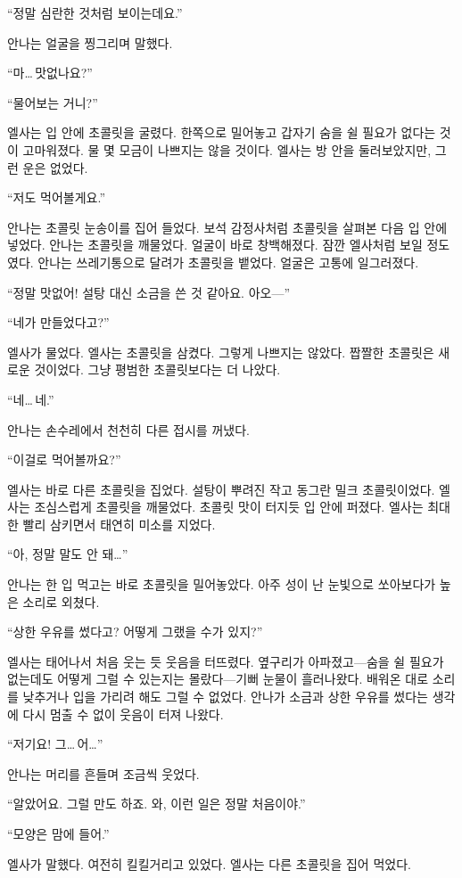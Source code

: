 ``정말 심란한 것처럼 보이는데요.''

안나는 얼굴을 찡그리며 말했다.

``마\ldots\,맛없나요?''

`` 물어보는 거니?''

엘사는 입 안에 초콜릿을 굴렸다. 한쪽으로 밀어놓고 갑자기 숨을 쉴 필요가 없다는 것이 고마워졌다. 물 몇 모금이 나쁘지는 않을 것이다. 엘사는 방 안을 둘러보았지만, 그런 운은 없었다.

``저도 먹어볼게요.''

안나는 초콜릿 눈송이를 집어 들었다. 보석 감정사처럼 초콜릿을 살펴본 다음 입 안에 넣었다. 안나는 초콜릿을 깨물었다. 얼굴이 바로 창백해졌다. 잠깐 엘사처럼 보일 정도였다. 안나는 쓰레기통으로 달려가 초콜릿을 뱉었다. 얼굴은 고통에 일그러졌다.

``정말 맛없어! 설탕 대신 소금을 쓴 것 같아요. 아오—''

``네가 만들었다고?''

엘사가 물었다. 엘사는 초콜릿을 삼켰다. 그렇게 나쁘지는 않았다. 짭짤한 초콜릿은 새로운 것이었다. 그냥 평범한 초콜릿보다는 더 나았다.

``네\ldots\,네.''

안나는 손수레에서 천천히 다른 접시를 꺼냈다.

``이걸로 먹어볼까요?''

엘사는 바로 다른 초콜릿을 집었다. 설탕이 뿌려진 작고 동그란 밀크 초콜릿이었다. 엘사는 조심스럽게 초콜릿을 깨물었다. 초콜릿 맛이 터지듯 입 안에 퍼졌다. 엘사는 최대한 빨리 삼키면서 태연히 미소를 지었다.

``아, 정말 말도 안 돼\ldots''

안나는 한 입 먹고는 바로 초콜릿을 밀어놓았다. 아주 성이 난 눈빛으로 쏘아보다가 높은 소리로 외쳤다.

``상한 우유를 썼다고? 어떻게 그랬을 수가 있지?''

엘사는 태어나서 처음 웃는 듯 웃음을 터뜨렸다. 옆구리가 아파졌고—숨을 쉴 필요가 없는데도 어떻게 그럴 수 있는지는 몰랐다—기뻐 눈물이 흘러나왔다. 배워온 대로 소리를 낮추거나 입을 가리려 해도 그럴 수 없었다. 안나가 소금과 상한 우유를 썼다는 생각에 다시 멈출 수 없이 웃음이 터져 나왔다.

``저기요! 그\ldots\,어\ldots''

안나는 머리를 흔들며 조금씩 웃었다.

``알았어요. 그럴 만도 하죠. 와, 이런 일은 정말 처음이야.''

``모양은 맘에 들어.''

엘사가 말했다. 여전히 킬킬거리고 있었다. 엘사는 다른 초콜릿을 집어 먹었다.

